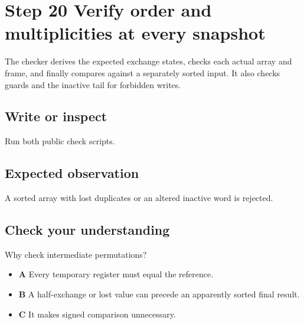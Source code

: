 \section{Step 20 Verify order and multiplicities at every
  snapshot}\label{009-sorting-visualizer-s20-step-20-verify-order-and-multiplicities-at-every-snapshot}

The checker derives the expected exchange states, checks each actual
array and frame, and finally compares against a separately sorted input.
It also checks guards and the inactive tail for forbidden writes.

\subsection{Write or
  inspect}\label{009-sorting-visualizer-s20-write-or-inspect}

Run both public check scripts.

\subsection{Expected
  observation}\label{009-sorting-visualizer-s20-expected-observation}

A sorted array with lost duplicates or an altered inactive word is
rejected.

\subsection{Check your
  understanding}\label{009-sorting-visualizer-s20-check-your-understanding}

Why check intermediate permutations?

\begin{itemize}
  \tightlist
  \item
        \textbf{A} Every temporary register must equal the reference.
  \item
        \textbf{B} A half-exchange or lost value can precede an apparently
        sorted final result.
  \item
        \textbf{C} It makes signed comparison unnecessary.
\end{itemize}
